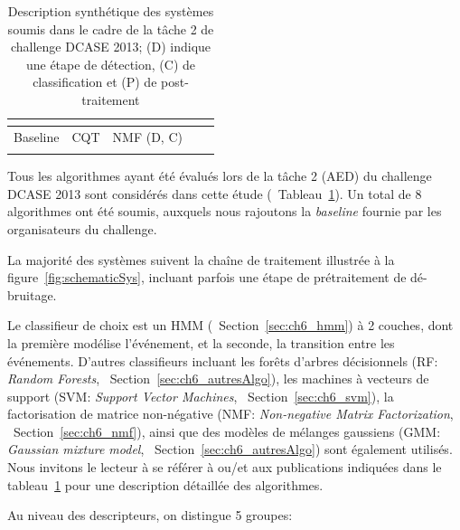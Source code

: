 \begin{table}[t]
\begin{center}
\begin{tabular}{lcccc}
\citep{VVK,gemmeke2013exemplar}     &                      &                              &           &             \\    
\hline
Baseline                            & CQT                  & NMF \hfill  (D, C)           &           &             \\ 
\citep{Giannoulis:2013a}            &                      &                              &           &             \\  
\hline      
\end{tabular}
\end{center}
\caption[Description synthétique des systèmes soumis dans le cadre de la tâche 2 de challenge DCASE 2013]{Description synthétique des systèmes soumis dans le cadre de la tâche 2 de challenge DCASE 2013; (D) indique une étape de détection, (C) de classification et (P) de post-traitement}
\label{tab:systemsDcase2013}
\end{table}

Tous les algorithmes ayant été évalués lors de la tâche 2 (AED) du challenge DCASE 2013 sont considérés dans cette étude (\cf~Tableau~\ref{tab:systemsDcase2013}). Un total de 8 algorithmes ont été soumis, auxquels nous rajoutons la \emph{baseline} fournie par les organisateurs du challenge.

La majorité des systèmes suivent la chaîne de traitement illustrée à la figure~\ref{fig:schematicSys}, incluant parfois une étape de prétraitement de dé-bruitage.

Le classifieur de choix est un HMM (\cf~Section~\ref{sec:ch6_hmm}) à 2 couches, dont la première modélise l'événement, et la seconde, la transition entre les événements. D'autres classifieurs incluant les forêts d'arbres décisionnels (RF: \emph{Random Forests}, \cf~Section~\ref{sec:ch6_autresAlgo}), les machines à vecteurs de support (SVM: \emph{Support Vector Machines}, \cf~Section~\ref{sec:ch6_svm}), la factorisation de matrice non-négative (NMF: \emph{Non-negative Matrix Factorization}, \cf~Section~\ref{sec:ch6_nmf}), ainsi que des modèles de mélanges gaussiens (GMM: \emph{Gaussian mixture model}, \cf~Section~\ref{sec:ch6_autresAlgo}) sont également utilisés. Nous invitons le lecteur à se référer à \citep{Stowell15} ou/et aux publications indiquées dans le tableau~\ref{tab:systemsDcase2013} pour une description détaillée des algorithmes.

Au niveau des descripteurs, on distingue 5 groupes:

